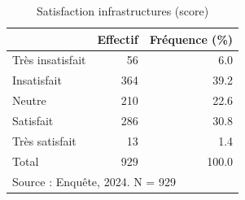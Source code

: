 \begin{table}[htbp]\centering
\def\sym#1{\ifmmode^{#1}\else\(^{#1}\)\fi}
\caption{Satisfaction infrastructures (score)}
\begin{tabular}{l*{2}{r}}
\toprule
            &    Effectif&Fréquence (\%)\\
\midrule
Très insatisfait&          56&         6.0\\
Insatisfait &         364&        39.2\\
Neutre      &         210&        22.6\\
Satisfait   &         286&        30.8\\
Très satisfait&          13&         1.4\\
Total       &         929&       100.0\\
\bottomrule
\multicolumn{3}{l}{\footnotesize Source : Enquête, 2024. N = 929}\\
\end{tabular}
\end{table}
